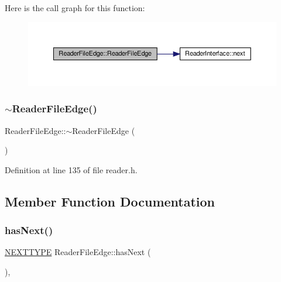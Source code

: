 Here is the call graph for this function\+:
\nopagebreak
\begin{figure}[H]
\begin{center}
\leavevmode
\includegraphics[width=350pt]{classReaderFileEdge_a519fd6f5c53a07c2019a36519ca68ea7_cgraph}
\end{center}
\end{figure}
\mbox{\label{classReaderFileEdge_aa4560a4109cd547de863f2efd2eeb779}} 
\subsubsection{\texorpdfstring{$\sim$\+Reader\+File\+Edge()}{~ReaderFileEdge()}}
{\footnotesize\ttfamily Reader\+File\+Edge\+::$\sim$\+Reader\+File\+Edge (\begin{DoxyParamCaption}{ }\end{DoxyParamCaption})\hspace{0.3cm}{\ttfamily [inline]}}



Definition at line 135 of file reader.\+h.



\subsection{Member Function Documentation}
\mbox{\label{classReaderFileEdge_a319f75e4d3ff14a4270e9da8ade89a3b}} 
\subsubsection{\texorpdfstring{has\+Next()}{hasNext()}}
{\footnotesize\ttfamily \hyperlink{classReaderInterface_ac2420ec8d2f60feadf2533d4fa77ec5e}{N\+E\+X\+T\+T\+Y\+PE} Reader\+File\+Edge\+::has\+Next (\begin{DoxyParamCaption}{ }\end{DoxyParamCaption})\hspace{0.3cm}{\ttfamily [inline]}, {\ttfamily [virtual]}}

